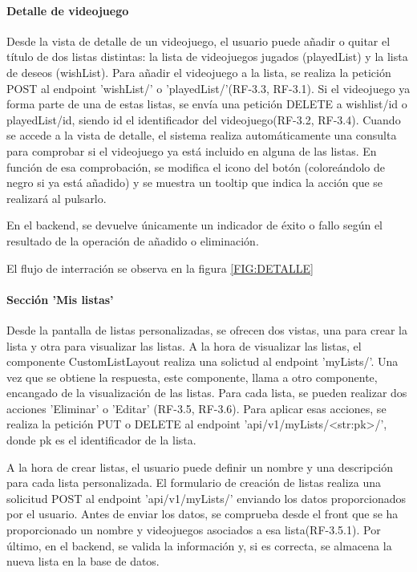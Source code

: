 \paragraph{Detalle de videojuego}
Desde la vista de detalle de un videojuego, el usuario puede añadir o quitar el título de dos listas distintas: la lista de videojuegos jugados (playedList) y
la lista de deseos (wishList). Para añadir el videojuego a la lista, se realiza la petición POST al endpoint 'wishList/' o 'playedList/'(RF-3.3,
RF-3.1). Si el videojuego ya forma parte de una de estas listas, 
se envía una petición DELETE a wishlist/{id} o playedList/{id}, siendo {id} el identificador del videojuego(RF-3.2, RF-3.4).
Cuando se accede a la vista de detalle, el sistema realiza automáticamente una consulta para comprobar si 
el videojuego ya está incluido en alguna de las listas. En función de esa comprobación, se modifica el icono del botón (coloreándolo de negro si ya está añadido) 
y se muestra un tooltip que indica la acción que se realizará al pulsarlo.

En el backend, se devuelve únicamente un indicador de éxito o fallo según el resultado de la operación de añadido o eliminación.

El flujo de interración se observa en la figura \ref{FIG:DETALLE}

\paragraph{Sección 'Mis listas'}
Desde la pantalla de listas personalizadas, se ofrecen dos vistas, una para crear la lista y otra para visualizar las listas. A la hora de 
visualizar las listas, el componente CustomListLayout realiza una solictud al endpoint 'myLists/'. Una vez que se obtiene la respuesta, este componente, 
llama a otro componente, encangado de la visualización de las listas. Para cada lista, se pueden realizar dos acciones 'Eliminar' o 'Editar' (RF-3.5, RF-3.6). Para 
aplicar esas acciones, se realiza la petición PUT o DELETE al endpoint 'api/v1/myLists/<str:pk>/', donde pk es el identificador de la lista. 

A la hora de crear listas, el usuario puede definir un nombre y una descripción para cada lista personalizada. 
El formulario de creación de listas realiza una solicitud POST al endpoint 'api/v1/myLists/' enviando los datos 
proporcionados por el usuario. Antes de enviar los datos, se comprueba desde el front que se ha proporcionado un nombre y 
videojuegos asociados a esa lista(RF-3.5.1). Por último, en el backend, se valida la información y, si es correcta, se almacena la nueva 
lista en la base de datos.

